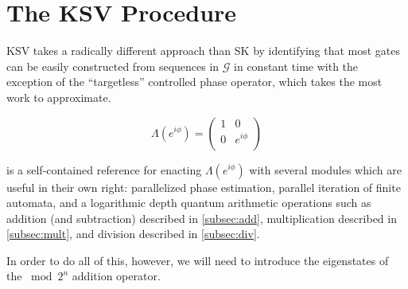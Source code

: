 \section{The KSV Procedure}
\label{sec:main-algo}

KSV takes a radically different approach than SK by identifying that most gates
can be easily constructed from sequences in
$\mathcal{G}$ in constant time with the exception of the ``targetless''
controlled phase operator, which takes the most work to approximate.

\begin{displaymath}
\Lambda(e^{i\phi}) = 
 \left(
  \begin{array}{cc}
    1 & 0 \\
    0 & e^{i\phi} \\
  \end{array} \right)
\end{displaymath}

\cite{ksv02} is a self-contained reference
for enacting $\Lambda(e^{i\phi})$ with several modules which are useful in
their own right:
parallelized phase estimation, parallel iteration of finite
automata, and a logarithmic depth quantum arithmetic operations such
as addition (and subtraction) described in \ref{subsec:add},
multiplication described in \ref{subsec:mult}, and division described
in \ref{subsec:div}.

In order to do all of this, however, we will need to introduce the eigenstates
of the $\bmod 2^n$ addition operator.





